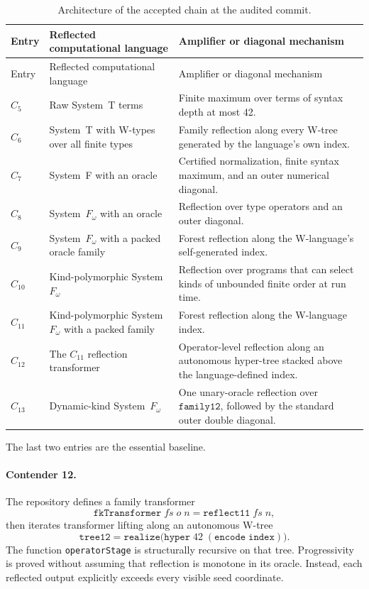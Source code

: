 \documentclass[11pt]{article}
\theoremstyle{definition}
\theoremstyle{remark}
\newcommand{\lean}[1]{\texttt{#1}}
\begin{document}
\begin{longtable}{@{}p{}p{}p{}@{}}
\caption{Architecture of the accepted chain at the audited commit.}
\label{tab:baseline}\\
\toprule
Entry & Reflected computational language & Amplifier or diagonal mechanism\\
\midrule
\endfirsthead
\toprule
Entry & Reflected computational language & Amplifier or diagonal mechanism\\
\midrule
\endhead
$C_5$ & Raw System~T terms & Finite maximum over terms of syntax depth at most 42.\\
$C_6$ & System~T with W-types over all finite types & Family reflection along every W-tree generated by the language's own index.\\
$C_7$ & System~F with an oracle & Certified normalization, finite syntax maximum, and an outer numerical diagonal.\\
$C_8$ & System~$F_\omega$ with an oracle & Reflection over type operators and an outer diagonal.\\
$C_9$ & System~$F_\omega$ with a packed oracle family & Forest reflection along the W-language's self-generated index.\\
$C_{10}$ & Kind-polymorphic System~$F_\omega$ & Reflection over programs that can select kinds of unbounded finite order at run time.\\
$C_{11}$ & Kind-polymorphic System~$F_\omega$ with a packed family & Forest reflection along the W-language index.\\
$C_{12}$ & The $C_{11}$ reflection transformer & Operator-level reflection along an autonomous hyper-tree stacked above the language-defined index.\\
$C_{13}$ & Dynamic-kind System~$F_\omega$ & One unary-oracle reflection over \(\lean{family12}\), followed by the standard outer double diagonal.\\
\bottomrule
\end{longtable}

The last two entries are the essential baseline.

\paragraph{Contender 12.}
The repository defines a family transformer
\[
  \lean{fkTransformer}\;fs\;o\;n = \lean{reflect11}\;fs\;n,
\]
then iterates transformer lifting along an autonomous W-tree
\[
  \lean{tree12}
  = \lean{realize}\bigl(\lean{hyper}\;42\;(\lean{encode}\;\lean{index})\bigr).
\]
The function \lean{operatorStage} is structurally recursive on that tree.
Progressivity is proved without assuming that reflection is monotone in its
oracle.  Instead, each reflected output explicitly exceeds every visible seed
coordinate.
\end{document}
